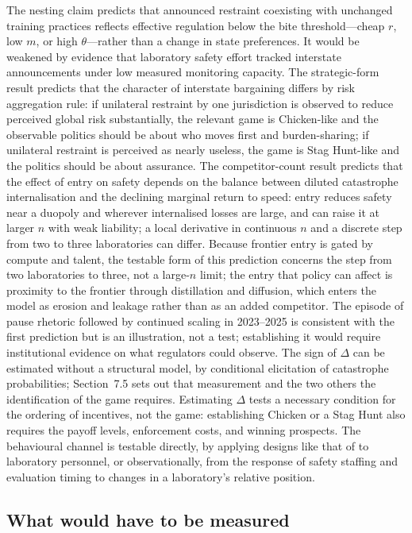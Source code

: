 \documentclass[11pt]{article}
\theoremstyle{plain}
\theoremstyle{definition}
\theoremstyle{remark}
\newcommand{\Delt}{\Delta}
\begin{document}
The nesting claim predicts that announced restraint coexisting with unchanged training practices reflects effective regulation below the bite threshold---cheap $r$, low $m$, or high $\theta$---rather than a change in state preferences. It would be weakened by evidence that laboratory safety effort tracked interstate announcements under low measured monitoring capacity. The strategic-form result predicts that the character of interstate bargaining differs by risk aggregation rule: if unilateral restraint by one jurisdiction is observed to reduce perceived global risk substantially, the relevant game is Chicken-like and the observable politics should be about who moves first and burden-sharing; if unilateral restraint is perceived as nearly useless, the game is Stag Hunt-like and the politics should be about assurance. The competitor-count result predicts that the effect of entry on safety depends on the balance between diluted catastrophe internalisation and the declining marginal return to speed: entry reduces safety near a duopoly and wherever internalised losses are large, and can raise it at larger $n$ with weak liability; a local derivative in continuous $n$ and a discrete step from two to three laboratories can differ. Because frontier entry is gated by compute and talent, the testable form of this prediction concerns the step from two laboratories to three, not a large-$n$ limit; the entry that policy can affect is proximity to the frontier through distillation and diffusion, which enters the model as erosion and leakage rather than as an added competitor. The episode of pause rhetoric followed by continued scaling in 2023--2025 is consistent with the first prediction but is an illustration, not a test; establishing it would require institutional evidence on what regulators could observe. The sign of $\Delt$ can be estimated without a structural model, by conditional elicitation of catastrophe probabilities; Section~7.5 sets out that measurement and the two others the identification of the game requires. Estimating $\Delt$ tests a necessary condition for the ordering of incentives, not the game: establishing Chicken or a Stag Hunt also requires the payoff levels, enforcement costs, and winning prospects. The behavioural channel is testable directly, by applying designs like that of \citet{fernandez2026} to laboratory personnel, or observationally, from the response of safety staffing and evaluation timing to changes in a laboratory's relative position.

\subsection{What would have to be measured}
\end{document}
